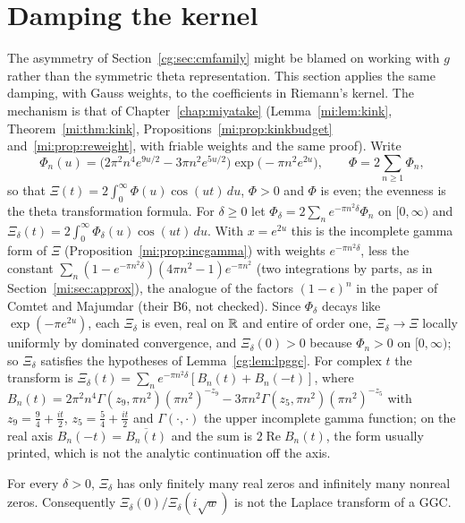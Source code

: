 \section{Damping the kernel}\label{cg:sec:kernel}

The asymmetry of Section~\ref{cg:sec:cmfamily} might be blamed on working with $g$ rather than the symmetric theta representation. This section applies the same damping, with Gauss weights, to the coefficients in Riemann's kernel. The mechanism is that of Chapter~\ref{chap:miyatake} (Lemma~\ref{mi:lem:kink}, Theorem~\ref{mi:thm:kink}, Propositions~\ref{mi:prop:kinkbudget} and~\ref{mi:prop:reweight}, with friable weights and the same proof). Write
\[
\Phi_n(u)=\bigl(2\pi^2n^4e^{9u/2}-3\pi n^2e^{5u/2}\bigr)\exp\bigl(-\pi n^2e^{2u}\bigr),\qquad \Phi=2\sum_{n\ge1}\Phi_n,
\]
so that $\Xi(t)=2\int_0^\infty\Phi(u)\cos(ut)\,du$, $\Phi>0$ and $\Phi$ is even; the evenness is the theta transformation formula. For $\delta\ge0$ let $\Phi_\delta=2\sum_ne^{-\pi n^2\delta}\Phi_n$ on $[0,\infty)$ and $\Xi_\delta(t)=2\int_0^\infty\Phi_\delta(u)\cos(ut)\,du$. With $x=e^{2u}$ this is the incomplete gamma form of $\Xi$ (Proposition~\ref{mi:prop:incgamma}) with weights $e^{-\pi n^2\delta}$, less the constant $\sum_n(1-e^{-\pi n^2\delta})(4\pi n^2-1)e^{-\pi n^2}$ (two integrations by parts, as in Section~\ref{mi:sec:approx}), the analogue of the factors $(1-\epsilon)^n$ in the paper of Comtet and Majumdar (their B6, not checked). Since $\Phi_\delta$ decays like $\exp(-\pi e^{2u})$, each $\Xi_\delta$ is even, real on $\mathbb{R}$ and entire of order one, $\Xi_\delta\to\Xi$ locally uniformly by dominated convergence, and $\Xi_\delta(0)>0$ because $\Phi_n>0$ on $[0,\infty)$; so $\Xi_\delta$ satisfies the hypotheses of Lemma~\ref{cg:lem:lpggc}. For complex $t$ the transform is $\Xi_\delta(t)=\sum_ne^{-\pi n^2\delta}[B_n(t)+B_n(-t)]$, where $B_n(t)=2\pi^2n^4\Gamma(z_9,\pi n^2)(\pi n^2)^{-z_9}-3\pi n^2\Gamma(z_5,\pi n^2)(\pi n^2)^{-z_5}$ with $z_9=\frac94+\frac{it}2$, $z_5=\frac54+\frac{it}2$ and $\Gamma(\cdot,\cdot)$ the upper incomplete gamma function; on the real axis $B_n(-t)=\overline{B_n(t)}$ and the sum is $2\operatorname{Re}B_n(t)$, the form usually printed, which is not the analytic continuation off the axis.

\begin{theorem}\label{cg:thm:kink}
For every $\delta>0$, $\Xi_\delta$ has only finitely many real zeros and infinitely many nonreal zeros. Consequently $\Xi_\delta(0)/\Xi_\delta(i\sqrt w)$ is not the Laplace transform of a GGC.
\end{theorem}

